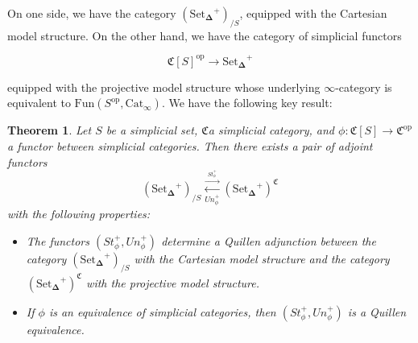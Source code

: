 \documentclass[12pt]{amsart}
\newcommand{\8}{\ensuremath{\infty}}
\newcommand{\C}{\ensuremath{\mathfrak{C}}}
\newcommand{\SSet}{\ensuremath{\text{Set}_{\boldsymbol{\Delta}}}}
\newcommand{\op}[1]{\ensuremath{{#1}^{\text{op}}}}
\newcommand{\adj}[2]{\ensuremath{\overset{\overset{#1}{ \rightarrow}}{\underset{#2}{\leftarrow}}}}
\newtheorem{theorem}{Theorem}
\begin{document}
On one side, we have the category $(\SSet^+)_{/S}$, equipped with the Cartesian model structure. On the other hand, we have the category of simplicial functors

$$
  \op{\mathfrak{C}[S]} \rightarrow \SSet^+
$$

equipped with the projective model structure whose underlying \8-category is equivalent to $\text{Fun}(\op{S}, \text{Cat}_\8). $ We have the following key result:

\begin{theorem}
  Let $S$ be a simplicial set, \C a simplicial category, and $\phi: \mathfrak{C}[S] \rightarrow \op\C$ a functor between simplicial categories. Then there exists a pair of adjoint functors
  \[(\SSet^+)_{/S} \adj{St_\phi^+}{Un_\phi^+} (\SSet^+)^\C\]
  with the following properties:
  \begin{itemize}
    \item[(1)] The functors $(St_\phi^+, Un_\phi^+)$ determine a Quillen adjunction between the category $(\SSet^+)_{/S}$ with the Cartesian model structure and the category $(\SSet^+)^\C$ with the projective model structure.
    \item[(2)] If $\phi$ is an equivalence of simplicial categories, then $(St_\phi^+, Un_\phi^+)$ is a Quillen equivalence.
  \end{itemize}
\end{theorem}
\end{document}
